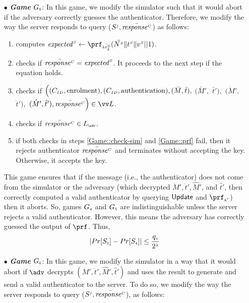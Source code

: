\begin{itemize}
\item[$\bullet$] \textit{\textbf{Game}}  $G_{\scriptscriptstyle  5}$: In this game, we modify the simulator such that it would abort if
the adversary correctly guesses the authenticator. Therefore, we modify the way the server responds to  query {\send($S^{\scriptscriptstyle  j},   \bar{\mathit{response}^{\scriptscriptstyle C}}$)} as follows: 

\begin{enumerate}
%
\item computes $\VS{\mathit{expected}} \gets \prf_{\sss\bar{\VS{\keyt_{\sss3}}}}(\ddot{\VS{\nonce}}  \| \VS{\trans} \| \VS{\verifier}|| 1)$.
%
\item checks if $\bar{\mathit{response}^{\scriptscriptstyle C}}=\mathit{expected}^{\scriptscriptstyle S}$. It proceeds to the next step if the equation holds. 
%
\item\label{Game::check-sim} checks if $\Big((C_{\scriptscriptstyle  ID},  \text{enrolment}), (C_{\scriptscriptstyle  ID},  \text{authentication}), (\bar M, \bar t),$ $ (\bar M',$ $ \bar t'),$ $ (\ddot M', $ $\ddot t'), $ $(\hat M', \hat t'), \bar{\VC{\mathit{response}}}\Big)\in \vv L$.

\item\label{Game::prf} checks if $ \bar{\VC{\mathit{response}}}\in L_{\sss \adv}$. 
%
\item if both checks in steps \ref{Game::check-sim} and \ref{Game::prf} fail, then it rejects authenticator $\bar{\mathit{response}^{\scriptscriptstyle C}}$ and terminates without accepting the key. Otherwise, it accepts the key. 
%
\end{enumerate}
This game ensures that if the message (i.e., the authenticator) does not come from the simulator or the adversary (which decrypted $\ddot M',\ddot t', \hat M'$, and  $\hat t'$, then correctly computed a valid authenticator by querying $\mathsf{Update}$ and $\prf_{\sss  k'}$) then it aborts. So, games $G_{\scriptscriptstyle  4}$ and $G_{\scriptscriptstyle  5}$ are indistinguishable unless the server rejects a valid authenticator. However, this means the adversary has correctly guessed the output of $\prf$. Thus, 
%
\begin{equation}\label{eq::game_5}
|Pr[S_{\scriptscriptstyle  5}]-Pr[S_{\scriptscriptstyle  4}]|\leq \frac{q_{\scriptscriptstyle  s}}{2^{\scriptscriptstyle \lambda}}
\end{equation}



\item[$\bullet$] \textit{\textbf{Game}}  $G_{\scriptscriptstyle  6}$: 
 In this game, we modify the simulator in a way that it would abort if $\adv$ decrypts $ (\ddot M', \ddot t', \hat M', \hat t')$ and uses the result to generate and send a valid authenticator to the server. To do so, we modify the way the server responds to  query {\send($S^{\scriptscriptstyle  j},   \bar{\mathit{response}^{\scriptscriptstyle C}}$)}, as follows: 


\end{itemize}
